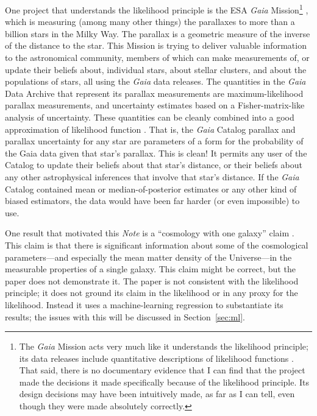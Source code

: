 \documentclass{article}
\newcommand{\documentname}{\textsl{Note}}
\newcommand{\sectionname}{Section}
\newcommand{\secref}[1]{\sectionname~\ref{#1}}
\begin{document}
One project that understands the likelihood principle is the ESA \textsl{Gaia} Mission\footnote{%
The \textsl{Gaia} Mission acts very much like it understands the likelihood principle; its data releases include quantitative descriptions of likelihood functions \cite{gaialf}.
That said, there is no documentary evidence that I can find that the project made the decisions it made specifically because of the likelihood principle.
Its design decisions may have been intuitively made, as far as I can tell, even though they were made absolutely correctly.}
\cite{gaia},
which is measuring (among many other things) the parallaxes to more than a billion stars in the Milky Way.
The parallax is a geometric measure of the inverse of the distance to the star.
This Mission is trying to deliver valuable information to the astronomical community, members of which can make measurements of, or update their beliefs about, individual stars, about stellar clusters, and about the populations of stars, all using the \textsl{Gaia} data releases.
The quantities in the \textsl{Gaia} Data Archive \cite{gaiadata} that represent its parallax measurements are maximum-likelihood parallax measurements, and uncertainty estimates based on a Fisher-matrix-like analysis of uncertainty.
These quantities can be cleanly combined into a good approximation of likelihood function \cite{gaialf}.
That is, the \textsl{Gaia} Catalog parallax and parallax uncertainty for any star are parameters of a form for the probability of the Gaia data given that star's parallax.
This is clean!
It permits any user of the Catalog to update their beliefs about that star's distance, or their beliefs about any other astrophysical inferences that involve that star's distance.
If the \textsl{Gaia} Catalog contained mean or median-of-posterior estimates or any other kind of biased estimators, the data would have been far harder (or even impossible) to use.

One result that motivated this \documentname{} is a ``cosmology with one galaxy'' claim \cite{onegalaxy}.
This claim is that there is significant information about some of the cosmological parameters---and especially the mean matter density of the Universe---in the measurable properties of a single galaxy.
This claim might be correct, but the paper does not demonstrate it.
The paper is not consistent with the likelihood principle; it does not ground its claim in the likelihood or in any proxy for the likelihood.
Instead it uses a machine-learning regression to substantiate its results; the issues with this will be discussed in \secref{sec:ml}.
\end{document}
